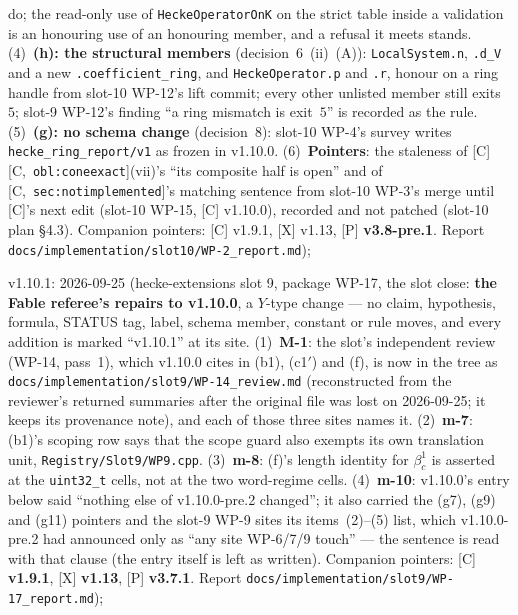 \documentclass[11pt]{article}
\theoremstyle{remark}
\newcommand{\HA}[1]{[C,~\texttt{#1}]}      %
\begin{document}
do; the read-only use of \texttt{HeckeOperatorOnK} on the strict table inside a validation is an
honouring use of an honouring member, and a refusal it meets stands.
(4)~\textbf{(h): the structural members} (decision~6~(ii)~(A)): \texttt{LocalSystem.n},
\texttt{.d\_V} and a new \texttt{.coefficient\_ring}, and \texttt{HeckeOperator.p} and \texttt{.r},
honour on a ring handle from slot-10 WP-12's lift commit; every other unlisted member still
exits~$5$; slot-9 WP-12's finding ``a ring mismatch is exit~$5$'' is recorded as the rule.
(5)~\textbf{(g): no schema change} (decision~8): slot-10 WP-4's survey writes
\texttt{hecke\_ring\_report/v1} as frozen in v1.10.0.
(6)~\textbf{Pointers}: the staleness of [C] \HA{obl:coneexact}(vii)'s ``its composite half is
open'' and of \HA{sec:notimplemented}'s matching sentence from slot-10 WP-3's merge until [C]'s next
edit (slot-10 WP-15, [C] v1.10.0), recorded and not patched (slot-10 plan \S4.3).
Companion pointers: [C] v1.9.1, [X] v1.13, [P] \textbf{v3.8-pre.1}. Report
\texttt{docs/implementation/slot10/WP-2\_report.md});

v1.10.1: 2026-09-25 (hecke-extensions slot 9, package WP-17, the slot close:
\textbf{the Fable referee's repairs to v1.10.0}, a $Y$-type change --- no claim, hypothesis,
formula, STATUS tag, label, schema member, constant or rule moves, and every addition is marked
``v1.10.1'' at its site. (1)~\textbf{M-1}: the slot's independent review (WP-14, pass~1), which
v1.10.0 cites in (b1), (c1$'$) and (f), is now in the tree as \texttt{docs/implementation/slot9/WP-14\_review.md} (reconstructed from the
reviewer's returned summaries after the original file was lost on 2026-09-25; it keeps its
provenance note), and each of those three sites names it. (2)~\textbf{m-7}: (b1)'s scoping row says
that the scope guard also exempts its own translation unit, \texttt{Registry/Slot9/WP9.cpp}.
(3)~\textbf{m-8}: (f)'s length identity for $\beta^1_c$ is asserted at the \texttt{uint32\_t} cells,
not at the two word-regime cells. (4)~\textbf{m-10}: v1.10.0's entry below said ``nothing else of
v1.10.0-pre.2 changed''; it also carried the (g7), (g9) and (g11) pointers and the slot-9 WP-9 sites
its items~(2)--(5) list, which v1.10.0-pre.2 had announced only as ``any site WP-6/7/9 touch'' ---
the sentence is read with that clause (the entry itself is left as written). Companion pointers:
[C] \textbf{v1.9.1}, [X] \textbf{v1.13}, [P] \textbf{v3.7.1}. Report
\texttt{docs/implementation/slot9/WP-17\_report.md});
\end{document}

